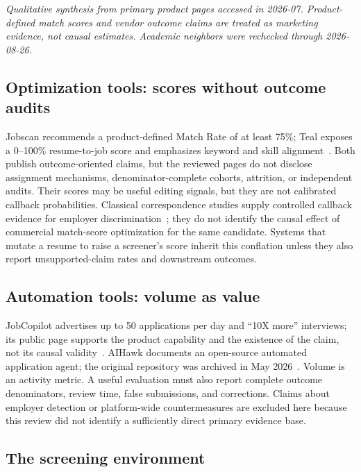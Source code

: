 \documentclass[11pt]{article}
\begin{document}
\emph{Qualitative synthesis from primary product pages accessed in 2026-07.
Product-defined match scores and vendor outcome claims are treated as marketing
evidence, not causal estimates. Academic neighbors were rechecked through
2026-08-26.}

\subsection{Optimization tools: scores without outcome audits}

Jobscan recommends a product-defined Match Rate of at least 75\%; Teal exposes
a 0--100\% resume-to-job score and emphasizes keyword and skill
alignment~\citep{jobscan2026,tealhq2026}. Both publish outcome-oriented claims,
but the reviewed pages do not disclose assignment mechanisms,
denominator-complete cohorts, attrition, or independent audits. Their scores
may be useful editing signals, but they are not calibrated callback
probabilities. Classical correspondence studies supply controlled callback
evidence for employer discrimination~\citep{bertrand2004emily}; they do not
identify the causal effect of commercial match-score optimization for the same
candidate. Systems that mutate a resume to raise a screener's score
\citep{erol2026synapse} inherit this conflation unless they also report
unsupported-claim rates and downstream outcomes.

\subsection{Automation tools: volume as value}

JobCopilot advertises up to 50 applications per day and ``10X more''
interviews; its public page supports the product capability and the existence
of the claim, not its causal validity~\citep{jobcopilot2026}. AIHawk documents
an open-source automated application agent; the original repository was
archived in May 2026~\citep{aihawk2026}. Volume is an activity metric. A useful
evaluation must also report complete outcome denominators, review time, false
submissions, and corrections. Claims about employer detection or platform-wide
countermeasures are excluded here because this review did not identify a
sufficiently direct primary evidence base.

\subsection{The screening environment}
\end{document}
